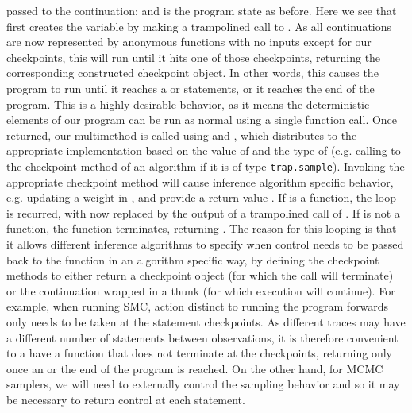 passed to the continuation; and \angstate is the program state as before.  Here we see that 
first creates the variable  by making a trampolined call to .  As all continuations are now
represented by anonymous functions with no inputs except for our checkpoints, this will run until it
hits one of those checkpoints, returning the corresponding constructed checkpoint object.  In other words,
this causes the program to run until it reaches a \sample or \observe statements, or it reaches the end of the
program.  This is a highly desirable behavior, as it means the deterministic elements of our program can be
run as normal using a single function call.
Once returned, our multimethod \checkpoint is called using  and
, which distributes to the appropriate \checkpoint implementation based on the value of
 and the type of  (e.g. calling to the \sample checkpoint method of an algorithm 
if it is of type  {\small \texttt{trap.sample}}).  
Invoking the appropriate checkpoint method will cause
inference algorithm specific behavior, e.g. updating a weight in \angstate, and provide a return value
.  If  is a function, the loop
is recurred, with  now replaced by the output of a trampolined call of .  If  is
not a function, the  function terminates, returning .  The reason for this looping is
that it allows different inference algorithms to specify when control needs to
be passed back to the \anginfer function in an algorithm specific way, by defining the checkpoint methods
to either return a checkpoint object (for which the  call will terminate) or the continuation
wrapped in a thunk (for which execution will continue).  For example, when running SMC,
action distinct to running the program forwards only needs to be taken at the \observe statement 
checkpoints.  As different traces may have a different number of \sample statements between observations,
it is therefore convenient to a have a function that does not terminate at the \sample checkpoints, returning
only once an \observe or the end of the program is reached.  On the other hand, for MCMC samplers, we
will need to externally control the sampling behavior and so it may be necessary to return control at each
\sample statement.

